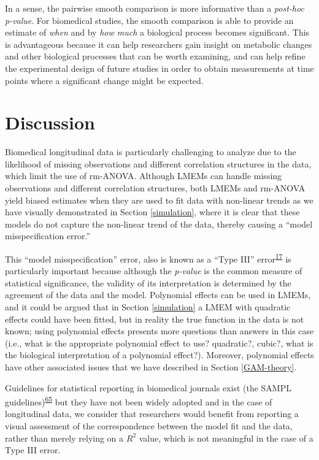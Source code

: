 \documentclass[
]{article}
\begin{document}
In a sense, the pairwise smooth comparison is more informative than a \emph{post-hoc} \emph{p-value}. For biomedical studies, the smooth comparison is able to provide an estimate of \emph{when} and by \emph{how much} a biological process becomes significant. This is advantageous because it can help researchers gain insight on metabolic changes and other biological processes that can be worth examining, and can help refine the experimental design of future studies in order to obtain measurements at time points where a significant change might be expected.

\hypertarget{discussion}{%
\section{Discussion}\label{discussion}}

Biomedical longitudinal data is particularly challenging to analyze due to the likelihood of missing observations and different correlation structures in the data, which limit the use of rm-ANOVA. Although LMEMs can handle missing observations and different correlation structures, both LMEMs and rm-ANOVA yield biased estimates when they are used to fit data with non-linear trends as we have visually demonstrated in Section \ref{simulation}, where it is clear that these models do not capture the non-linear trend of the data, thereby causing a ``model misspecification error.''

This ``model misspecification'' error, also is known as a ``Type III'' error\textsuperscript{\protect\hyperlink{ref-dennis2019}{17}} is particularly important because although the \emph{p-value} is the common measure of statistical significance, the validity of its interpretation is determined by the agreement of the data and the model. Polynomial effects can be used in LMEMs, and it could be argued that in Section \ref{simulation} a LMEM with quadratic effects could have been fitted, but in reality the true function in the data is not known; using polynomial effects presents more questions than answers in this case (i.e., what is the appropriate polynomial effect to use? quadratic?, cubic?, what is the biological interpretation of a polynomial effect?). Moreover, polynomial effects have other associated issues that we have described in Section \ref{GAM-theory}.

Guidelines for statistical reporting in biomedical journals exist (the SAMPL guidelines)\textsuperscript{\protect\hyperlink{ref-lang2015}{65}} but they have not been widely adopted and in the case of longitudinal data, we consider that researchers would benefit from reporting a visual assessment of the correspondence between the model fit and the data, rather than merely relying on a \(R^2\) value, which is not meaningful in the case of a Type III error.
\end{document}
